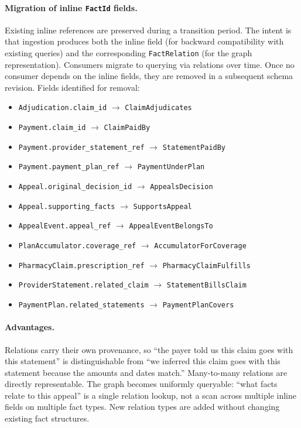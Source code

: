\documentclass[11pt]{article}
\begin{document}
\paragraph{Migration of inline \texttt{FactId} fields.}
Existing inline references are preserved during a transition period.
The intent is that ingestion produces both the inline field (for
backward compatibility with existing queries) and the corresponding
\texttt{FactRelation} (for the graph representation). Consumers migrate
to querying via relations over time. Once no consumer depends on the
inline fields, they are removed in a subsequent schema revision.
Fields identified for removal:

\begin{itemize}
\item \texttt{Adjudication.claim\_id} $\rightarrow$ \texttt{ClaimAdjudicates}
\item \texttt{Payment.claim\_id} $\rightarrow$ \texttt{ClaimPaidBy}
\item \texttt{Payment.provider\_statement\_ref} $\rightarrow$ \texttt{StatementPaidBy}
\item \texttt{Payment.payment\_plan\_ref} $\rightarrow$ \texttt{PaymentUnderPlan}
\item \texttt{Appeal.original\_decision\_id} $\rightarrow$ \texttt{AppealsDecision}
\item \texttt{Appeal.supporting\_facts} $\rightarrow$ \texttt{SupportsAppeal}
\item \texttt{AppealEvent.appeal\_ref} $\rightarrow$ \texttt{AppealEventBelongsTo}
\item \texttt{PlanAccumulator.coverage\_ref} $\rightarrow$ \texttt{AccumulatorForCoverage}
\item \texttt{PharmacyClaim.prescription\_ref} $\rightarrow$ \texttt{PharmacyClaimFulfills}
\item \texttt{ProviderStatement.related\_claim} $\rightarrow$ \texttt{StatementBillsClaim}
\item \texttt{PaymentPlan.related\_statements} $\rightarrow$ \texttt{PaymentPlanCovers}
\end{itemize}

\paragraph{Advantages.}
Relations carry their own provenance, so ``the payer told us this
claim goes with this statement'' is distinguishable from ``we inferred
this claim goes with this statement because the amounts and dates
match.'' Many-to-many relations are directly representable. The graph
becomes uniformly queryable: ``what facts relate to this appeal''
is a single relation lookup, not a scan across multiple inline fields
on multiple fact types. New relation types are added without changing
existing fact structures.
\end{document}
